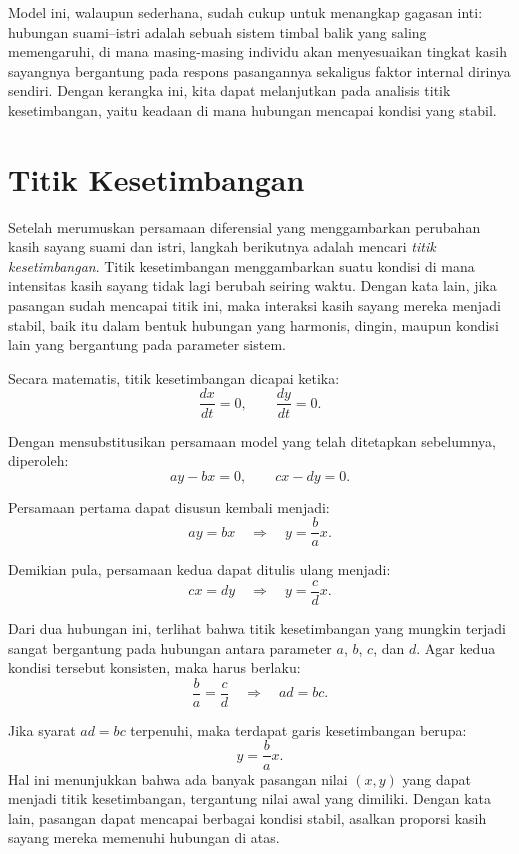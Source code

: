 \documentclass{bukumjh}
\begin{document}
Model ini, walaupun sederhana, sudah cukup untuk menangkap gagasan inti: hubungan suami--istri adalah sebuah sistem timbal balik yang saling memengaruhi, di mana masing-masing individu akan menyesuaikan tingkat kasih sayangnya bergantung pada respons pasangannya sekaligus faktor internal dirinya sendiri. 
Dengan kerangka ini, kita dapat melanjutkan pada analisis titik kesetimbangan, yaitu keadaan di mana hubungan mencapai kondisi yang stabil.

\section{Titik Kesetimbangan}

Setelah merumuskan persamaan diferensial yang menggambarkan perubahan kasih sayang suami dan istri, langkah berikutnya adalah mencari \emph{titik kesetimbangan}. 
Titik kesetimbangan menggambarkan suatu kondisi di mana intensitas kasih sayang tidak lagi berubah seiring waktu. 
Dengan kata lain, jika pasangan sudah mencapai titik ini, maka interaksi kasih sayang mereka menjadi stabil, baik itu dalam bentuk hubungan yang harmonis, dingin, maupun kondisi lain yang bergantung pada parameter sistem.

Secara matematis, titik kesetimbangan dicapai ketika:
\[
\frac{dx}{dt} = 0, \qquad \frac{dy}{dt} = 0.
\]

Dengan mensubstitusikan persamaan model yang telah ditetapkan sebelumnya, diperoleh:
\[
a y - b x = 0, \qquad c x - d y = 0.
\]

Persamaan pertama dapat disusun kembali menjadi:
\[
a y = b x \quad \Rightarrow \quad y = \frac{b}{a}x.
\]

Demikian pula, persamaan kedua dapat ditulis ulang menjadi:
\[
c x = d y \quad \Rightarrow \quad y = \frac{c}{d}x.
\]

Dari dua hubungan ini, terlihat bahwa titik kesetimbangan yang mungkin terjadi sangat bergantung pada hubungan antara parameter $a$, $b$, $c$, dan $d$. 
Agar kedua kondisi tersebut konsisten, maka harus berlaku:
\[
\frac{b}{a} = \frac{c}{d} \quad \Rightarrow \quad ad = bc.
\]

Jika syarat $ad = bc$ terpenuhi, maka terdapat garis kesetimbangan berupa:
\[
y = \frac{b}{a}x.
\]
Hal ini menunjukkan bahwa ada banyak pasangan nilai $(x,y)$ yang dapat menjadi titik kesetimbangan, tergantung nilai awal yang dimiliki. 
Dengan kata lain, pasangan dapat mencapai berbagai kondisi stabil, asalkan proporsi kasih sayang mereka memenuhi hubungan di atas.
\end{document}
